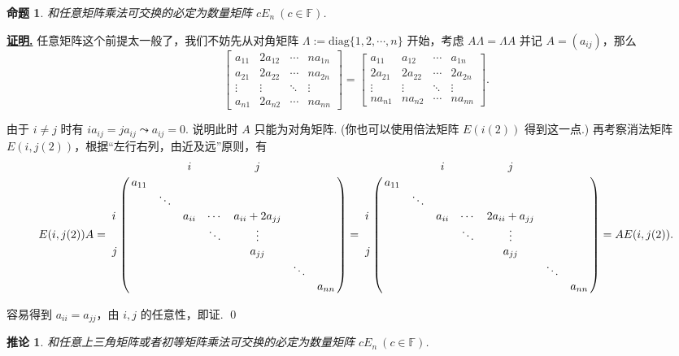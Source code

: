\documentclass[10pt,openany]{article}
\theoremstyle{thmstyle} %
\theoremstyle{defstyle} %
\newtheorem{corollary}[theorem]{推论}
\theoremstyle{prostyle} %
\newtheorem{proposition}[theorem]{命题}
\theoremstyle{exastyle}
\theoremstyle{remstyle}
\renewenvironment{proof}[1][证明]{\par\underline{\textbf{#1.}} \;\fangsong}{\qed\par}
\newcommand{\F}{\mathbb{F}}
\begin{document}
\begin{proposition}	\label{1.3.20}
	和任意矩阵乘法可交换的必定为数量矩阵 \( cE_n \ (c \in \F)\).

\end{proposition}

\begin{proof}
	任意矩阵这个前提太一般了，我们不妨先从对角矩阵 \( \Lambda:=\mathrm{diag}\{1,2,\cdots,n\} \) 开始，考虑 \( A\Lambda=\Lambda A \) 并记 \( A=(a_{ij}) \)，那么
	\[ \begin{bmatrix}
		a_{11} & 2a_{12} & \cdots & na_{1n} \\
		a_{21} & 2a_{22} & \cdots & na_{2n} \\
		\vdots & \vdots & \ddots & \vdots \\
		a_{n1} & 2a_{n2} & \cdots & na_{nn}
	\end{bmatrix}=\begin{bmatrix}
		a_{11} & a_{12} & \cdots & a_{1n} \\
		2a_{21} & 2a_{22} & \cdots & 2a_{2n} \\
	    \vdots & \vdots & \ddots & \vdots \\
	    na_{n1} & na_{n2} & \cdots & na_{nn}
	\end{bmatrix}. \]
	
	由于 \( i \neq j \) 时有 \( ia_{ij}=ja_{ij} \leadsto a_{ij}=0 \). 说明此时 \( A \) 只能为对角矩阵. (你也可以使用倍法矩阵 \( E(i(2)) \) 得到这一点.) 再考察消法矩阵 \( E(i,j(2)) \)，根据“左行右列，由近及远”原则，有
	\[ E(i,j(2))A= \bordermatrix{
		& & & \textbf{\(i\)} & & \textbf{\(j\)} & & \cr
		& a_{11} & & & & & &  \cr
		& & \ddots & & & & &  \cr
		\textbf{\(i\)}	& & & a_{ii} & \cdots & a_{ii}+2a_{jj} & &  \cr
		& & & & \ddots & \vdots & &  \cr
		\textbf{\(j\)}	& & & & & a_{jj} & &  \cr
		& & & & & & \ddots  &  \cr
		& & & & & & & a_{nn} \cr
	}= \bordermatrix{
	& & & \textbf{\(i\)} & & \textbf{\(j\)} & & \cr
	& a_{11} & & & & & &  \cr
	& & \ddots & & & & &  \cr
	\textbf{\(i\)}	& & & a_{ii} & \cdots & 2a_{ii}+a_{jj} & &  \cr
	& & & & \ddots & \vdots & &  \cr
	\textbf{\(j\)}	& & & & & a_{jj} & &  \cr
	& & & & & & \ddots  &  \cr
	& & & & & & & a_{nn} \cr
	}=AE(i,j(2)). \]
	
	容易得到 \( a_{ii}=a_{jj} \)，由 \( i,j \) 的任意性，即证.
\end{proof}

\begin{corollary}
	和任意上三角矩阵或者初等矩阵乘法可交换的必定为数量矩阵 \( cE_n  \ (c \in \F) \).
\end{corollary}
\end{document}
